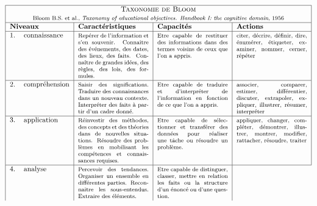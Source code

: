 $$\begin{tabular}{|rl|p{3.5cm}|p{3.5cm}|p{3.5cm}|}
\hline
\multicolumn{5}{|c|}{\textsc{Taxonomie de Bloom}}\\
\multicolumn{5}{|c|}{\footnotesize Bloom B.S. et al., \emph{Taxonomy of educational objectives. Handbook I: the cognitive domain}, 1956}\\
\hline
\multicolumn{2}{|l|}{\textbf{Niveaux}} & \textbf{Caractéristiques} & \textbf{Capacités} & \textbf{Actions}\\
\hline
1. & connaissance 	& \footnotesize Repérer de l'information et s'en souvenir.
					  Connaître des événements, des dates, des lieux, des faits.
					  Connaître de grandes idées, des règles, des lois, des formules.
					& \footnotesize Etre capable de restituer des informations dans des termes voisins 
					  de ceux que l'on a appris.
					& \footnotesize citer, décrire, définir, dire, énumérer, étiqueter, examiner, 
					  nommer, cerner, répéter \\
\hline
2. & compréhension 	& \footnotesize Saisir des significa\-tions.
					  Traduire des con\-nais\-san\-ces dans un nouveau contexte.
					  Interpréter des faits à partir d'un cadre donné.
					& \footnotesize Etre capable de traduire et d'interpréter de l'information en fonction
					  de ce que l'on a appris.
					& \footnotesize associer, comparer, estimer, différentier, discuter, extrapoler, 
					  expliquer, illustrer, résumer, interpréter \\
\hline
3. & application 	& \footnotesize Réinvestir des méthodes, des concepts et des théories 
					  dans de nouvelles situations.
					  Résoudre des problèmes en mobilisant les compétences et connaissances
					  requises.
					& \footnotesize Etre capable de sélectionner et transférer des données pour 
					  réaliser une tâche ou résoudre un problème.
					& \footnotesize appliquer, changer, compléter, démontrer, illustrer, montrer,
					  modifier, rattacher, résoudre, traiter\\
\hline
4. & analyse 		& \footnotesize Percevoir des tendances.
					  Organiser un ensemble en différentes parties.
					  Reconnaître les sous-entendus.
					  Extraire des éléments.
					& \footnotesize Etre capable de distinguer, classer, mettre en relation les faits 
					  ou la structure d'un énoncé ou d'une question.

\end{tabular}$$

